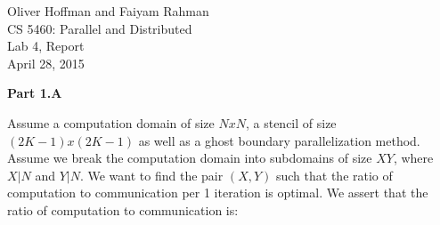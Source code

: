 \documentclass[12pt,twoside, parskip=full]{scrartcl}
\begin{document}
\begin{flushleft}

Oliver Hoffman and Faiyam Rahman
\\CS 5460: Parallel and Distributed
\\Lab 4, Report
\\April 28, 2015
\end{flushleft}

\textbf{Part 1.A} 


Assume a computation domain of size $NxN$, a stencil of size $(2K-1)x(2K-1)$ as well as a ghost boundary parallelization method. Assume we break the computation domain into subdomains of size $XY$, where $X|N$ and $Y|N$. We want to find the pair $(X,Y)$ such that the ratio of computation to communication per 1 iteration is optimal. We assert that the ratio of computation to communication is:
\end{document}

